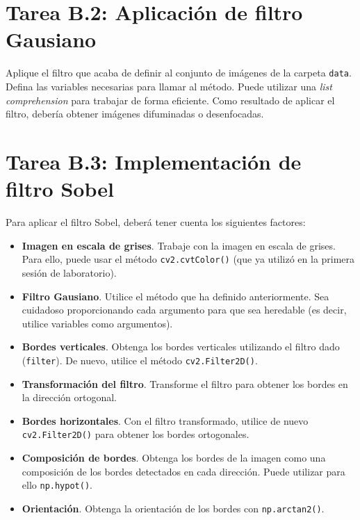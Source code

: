 \section*{Tarea B.2: Aplicación de filtro Gausiano}
{}

Aplique el filtro que acaba de definir al conjunto de imágenes de la carpeta \texttt{data}. Defina las variables necesarias para llamar al método. Puede utilizar una \textit{list comprehension} para trabajar de forma eficiente. Como resultado de aplicar el filtro, debería obtener imágenes difuminadas o desenfocadas.

\section*{Tarea B.3: Implementación de filtro Sobel}
{}

Para aplicar el filtro Sobel, deberá tener cuenta los siguientes factores:

\begin{itemize}
    \item \textbf{Imagen en escala de grises}. Trabaje con la imagen en escala de grises. Para ello, puede usar el método \texttt{cv2.cvtColor()} (que ya utilizó en la primera sesión de laboratorio).
    
    \item \textbf{Filtro Gausiano}. Utilice el método que ha definido anteriormente. Sea cuidadoso proporcionando cada argumento para que sea heredable (es decir, utilice variables como argumentos).
    
    \item \textbf{Bordes verticales}. Obtenga los bordes verticales utilizando el filtro dado (\texttt{filter}). De nuevo, utilice el método \texttt{cv2.Filter2D()}.
    \item \textbf{Transformación del filtro}. Transforme el filtro para obtener los bordes en la dirección ortogonal.
    \item \textbf{Bordes horizontales}. Con el filtro transformado, utilice de nuevo \texttt{cv2.Filter2D()} para obtener los bordes ortogonales.
    \item \textbf{Composición de bordes}. Obtenga los bordes de la imagen como una composición de los bordes detectados en cada dirección. Puede utilizar para ello \texttt{np.hypot()}.
    \item \textbf{Orientación}. Obtenga la orientación de los bordes con \texttt{np.arctan2()}.
\end{itemize}

